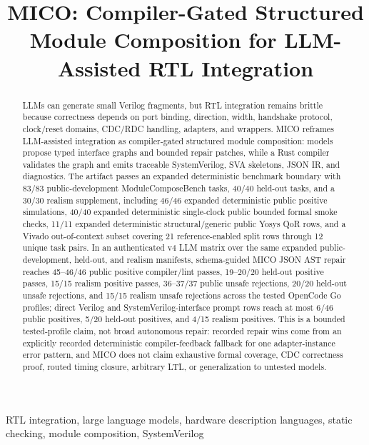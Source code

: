 \documentclass[conference]{IEEEtran}
\title{MICO: Compiler-Gated Structured Module Composition for LLM-Assisted RTL Integration}
\author{
\IEEEauthorblockN{Anonymous Author(s)}
\IEEEauthorblockA{Paper under double-blind review}
}
\begin{document}
\maketitle

\begin{abstract}
LLMs can generate small Verilog fragments, but RTL integration remains brittle because correctness depends on port binding, direction, width, handshake protocol, clock/reset domains, CDC/RDC handling, adapters, and wrappers. MICO reframes LLM-assisted integration as compiler-gated structured module composition: models propose typed interface graphs and bounded repair patches, while a Rust compiler validates the graph and emits traceable SystemVerilog, SVA skeletons, JSON IR, and diagnostics. The artifact passes an expanded deterministic benchmark boundary with 83/83 public-development ModuleComposeBench tasks, 40/40 held-out tasks, and a 30/30 realism supplement, including 46/46 expanded deterministic public positive simulations, 40/40 expanded deterministic single-clock public bounded formal smoke checks, 11/11 expanded deterministic structural/generic public Yosys QoR rows, and a Vivado out-of-context subset covering 21 reference-enabled split rows through 12 unique task pairs. In an authenticated v4 LLM matrix over the same expanded public-development, held-out, and realism manifests, schema-guided MICO JSON AST repair reaches 45--46/46 public positive compiler/lint passes, 19--20/20 held-out positive passes, 15/15 realism positive passes, 36--37/37 public unsafe rejections, 20/20 held-out unsafe rejections, and 15/15 realism unsafe rejections across the tested OpenCode Go profiles; direct Verilog and SystemVerilog-interface prompt rows reach at most 6/46 public positives, 5/20 held-out positives, and 4/15 realism positives. This is a bounded tested-profile claim, not broad autonomous repair: recorded repair wins come from an explicitly recorded deterministic compiler-feedback fallback for one adapter-instance error pattern, and MICO does not claim exhaustive formal coverage, CDC correctness proof, routed timing closure, arbitrary LTL, or generalization to untested models.
\end{abstract}

\begin{IEEEkeywords}
RTL integration, large language models, hardware description languages, static checking, module composition, SystemVerilog
\end{IEEEkeywords}















\end{document}
